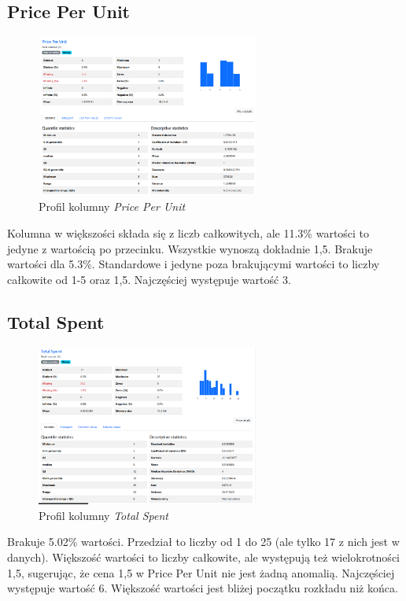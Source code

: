 \documentclass[a4paper,12pt]{article}
\begin{document}
\subsection{Price Per Unit}

\begin{figure}[H]
  \centering
  \includegraphics[width=0.65\textwidth]{images/py_4.png}
  \caption{Profil kolumny \textit{Price Per Unit}}
\end{figure}

Kolumna w większości składa się z liczb całkowitych, ale 11.3\% wartości to jedyne z wartością po przecinku. Wszystkie wynoszą dokładnie 1,5. Brakuje wartości dla 5.3\%. Standardowe i jedyne poza brakującymi wartości to liczby całkowite od 1-5 oraz 1,5. Najczęściej występuje wartość 3.

\subsection{Total Spent}

\begin{figure}[H]
  \centering
  \includegraphics[width=0.65\textwidth]{images/py_5.png}
  \caption{Profil kolumny \textit{Total Spent}}
\end{figure}

Brakuje 5.02\% wartości. Przedział to liczby od 1 do 25 (ale tylko 17 z nich jest w danych). Większość wartości to liczby całkowite, ale występują też wielokrotności 1,5, sugerując, że cena 1,5 w Price Per Unit nie jest żadną anomalią. Najczęściej występuje wartość 6. Większość wartości jest bliżej początku rozkładu niż końca.
\end{document}
